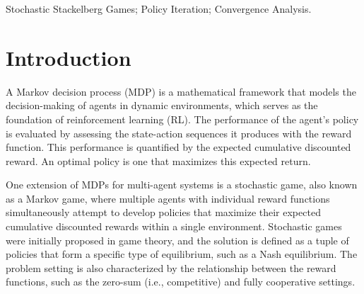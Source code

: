 \documentclass{acml}
\begin{document}
\begin{abstract}
We address two-player general-sum stochastic Stackelberg games (SSGs), where the leader’s policy is optimized considering the best-response follower whose policy is optimal for its reward under the leader.
Existing policy gradient and value iteration approaches for SSGs do not guarantee monotone improvement in the leader’s policy under the best-response follower.
Consequently, their performance is not guaranteed when their limits are not stationary Stackelberg equilibria (SSEs), which do not necessarily exist.
In this paper, we derive a policy improvement theorem for SSGs under the best-response follower and propose a novel policy iteration algorithm that guarantees monotone improvement in the leader’s performance. 
Additionally, we introduce Pareto-optimality as an extended optimality of the SSE and prove that our method converges to the Pareto front when the leader is myopic.
\end{abstract}

\begin{keywords}
Stochastic Stackelberg Games; Policy Iteration; Convergence Analysis.
\end{keywords}


\section{Introduction}
A Markov decision process (MDP) is a mathematical framework that models the decision-making of agents in dynamic environments, which serves as the foundation of reinforcement learning (RL). 
The performance of the agent's policy is evaluated by assessing the state-action sequences it produces with the reward function.
This performance is quantified by the expected cumulative discounted reward.
An optimal policy is one that maximizes this expected return.

One extension of MDPs for multi-agent systems is a stochastic game, also known as a Markov game, where multiple agents with individual reward functions simultaneously attempt to develop policies that maximize their expected cumulative discounted rewards within a single environment.
Stochastic games were initially proposed in game theory, and the solution is defined as a tuple of policies that form a specific type of equilibrium, such as a Nash equilibrium. %
The problem setting is also characterized by the relationship between the reward functions, such as the zero-sum (i.e., competitive) and fully cooperative settings.
\end{document}
